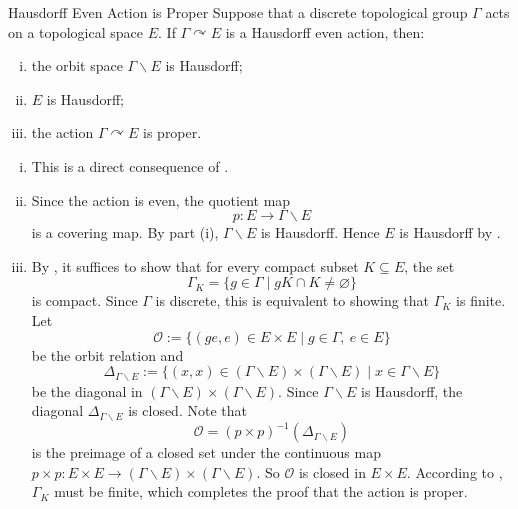 \documentclass{report}
\def\acts{\curvearrowright}
\begin{document}
\begin{proposition}{Hausdorff Even Action is Proper}{}
Suppose that a discrete topological group \(\Gamma\) acts on a topological space \(E\).
If \(\Gamma \acts E\) is a Hausdorff even action, then:
\begin{enumerate}[(i)]
    \item the orbit space \(\Gamma\backslash E\) is Hausdorff;
    \item \(E\) is Hausdorff;
    \item the action \(\Gamma\acts E\) is proper.
\end{enumerate}
\end{proposition}

\begin{prf}
\begin{enumerate}[(i)]
    \item This is a direct consequence of .

    \item Since the action is even, the quotient map
    \[
        p:E\to \Gamma\backslash E
    \]
    is a covering map. By part (i), \(\Gamma\backslash E\) is Hausdorff.
    Hence \(E\) is Hausdorff by
    .

    \item By
    , it
    suffices to show that for every compact subset \(K\subseteq E\), the set
    \[
        \Gamma_K
        =
        \{g\in \Gamma \mid gK\cap K\neq \varnothing\}
    \]
    is compact. Since \(\Gamma\) is discrete, this is equivalent to showing that \(\Gamma_K\) is finite. Let
    \[
        \mathcal O
        :=
        \{(ge,e)\in E\times E \mid g\in \Gamma,\ e\in E\}
    \]
    be the orbit relation and
	\[
	   \Delta_{\Gamma\backslash E}:=\{(x,x)\in (\Gamma\backslash E)\times (\Gamma\backslash E)\mid x\in \Gamma\backslash E\}
	\]
	be the diagonal in \((\Gamma\backslash E)\times (\Gamma\backslash E)\). Since \(\Gamma\backslash E\) is Hausdorff, the diagonal \(\Delta_{\Gamma\backslash E}\) is closed. Note that 
    \[
        \mathcal O=(p\times p)^{-1}
        \left(\Delta_{\Gamma\backslash E}\right)
    \]
	is the preimage of a closed set under the continuous map \(p\times p: E\times E\to (\Gamma\backslash E)\times (\Gamma\backslash E)\). So \(\mathcal O\) is closed in
    \(E\times E\). According to , \(\Gamma_K\) must be finite, which completes the proof that the action is proper.
\end{enumerate}
\end{prf}
\end{document}
